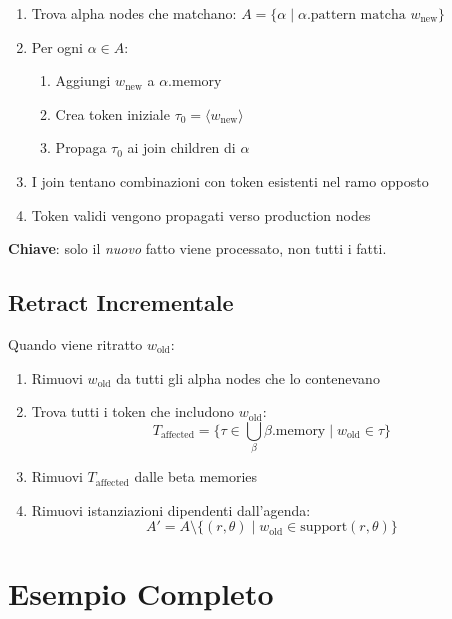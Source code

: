 \begin{enumerate}
\item Trova alpha nodes che matchano: $A = \{\alpha \mid \alpha.\text{pattern} \text{ matcha } w_{\text{new}}\}$
\item Per ogni $\alpha \in A$:
   \begin{enumerate}
   \item Aggiungi $w_{\text{new}}$ a $\alpha.\text{memory}$
   \item Crea token iniziale $\tau_0 = \langle w_{\text{new}} \rangle$
   \item Propaga $\tau_0$ ai join children di $\alpha$
   \end{enumerate}
\item I join tentano combinazioni con token esistenti nel ramo opposto
\item Token validi vengono propagati verso production nodes
\end{enumerate}

\textbf{Chiave}: solo il \textit{nuovo} fatto viene processato, non tutti i fatti.

\subsection{Retract Incrementale}

Quando viene ritratto $w_{\text{old}}$:

\begin{enumerate}
\item Rimuovi $w_{\text{old}}$ da tutti gli alpha nodes che lo contenevano
\item Trova tutti i token che includono $w_{\text{old}}$:
   \begin{equation}
   T_{\text{affected}} = \{\tau \in \bigcup_\beta \beta.\text{memory} \mid w_{\text{old}} \in \tau\}
   \end{equation}
\item Rimuovi $T_{\text{affected}}$ dalle beta memories
\item Rimuovi istanziazioni dipendenti dall'agenda:
   \begin{equation}
   A' = A \setminus \{(r, \theta) \mid w_{\text{old}} \in \text{support}(r, \theta)\}
   \end{equation}
\end{enumerate}

\section{Esempio Completo}

